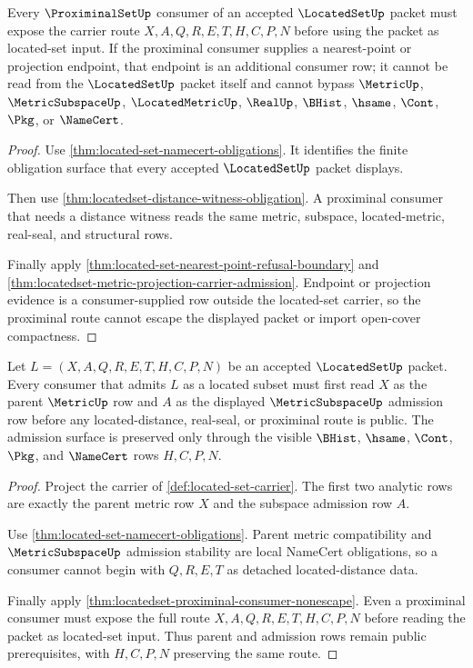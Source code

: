 \begin{theorem}
\label{thm:locatedset-proximinal-consumer-nonescape}
Every $\ProximinalSetUp$ consumer of an accepted $\LocatedSetUp$ packet must expose the carrier route $X,A,Q,R,E,T,H,C,P,N$ before using the packet as located-set input. If the proximinal consumer supplies a nearest-point or projection endpoint, that endpoint is an additional consumer row; it cannot be read from the $\LocatedSetUp$ packet itself and cannot bypass $\MetricUp$, $\MetricSubspaceUp$, $\LocatedMetricUp$, $\RealUp$, $\BHist$, $\hsame$, $\Cont$, $\Pkg$, or $\NameCert$.
\end{theorem}
\begin{proof}
Use \autoref{thm:located-set-namecert-obligations}. It identifies the finite obligation surface that every accepted $\LocatedSetUp$ packet displays.

Then use \autoref{thm:locatedset-distance-witness-obligation}. A proximinal consumer that needs a distance witness reads the same metric, subspace, located-metric, real-seal, and structural rows.

Finally apply \autoref{thm:located-set-nearest-point-refusal-boundary} and \autoref{thm:locatedset-metric-projection-carrier-admission}. Endpoint or projection evidence is a consumer-supplied row outside the located-set carrier, so the proximinal route cannot escape the displayed packet or import open-cover compactness.
\end{proof}

\begin{theorem}
\label{thm:located-set-parent-subspace-admission}
Let $L=(X,A,Q,R,E,T,H,C,P,N)$ be an accepted $\LocatedSetUp$ packet. Every consumer that admits $L$ as a located subset must first read $X$ as the parent $\MetricUp$ row and $A$ as the displayed $\MetricSubspaceUp$ admission row before any located-distance, real-seal, or proximinal route is public. The admission surface is preserved only through the visible $\BHist$, $\hsame$, $\Cont$, $\Pkg$, and $\NameCert$ rows $H,C,P,N$.
\end{theorem}
\begin{proof}
Project the carrier of \autoref{def:located-set-carrier}. The first two analytic rows are exactly the parent metric row $X$ and the subspace admission row $A$.

Use \autoref{thm:located-set-namecert-obligations}. Parent metric compatibility and $\MetricSubspaceUp$ admission stability are local NameCert obligations, so a consumer cannot begin with $Q,R,E,T$ as detached located-distance data.

Finally apply \autoref{thm:locatedset-proximinal-consumer-nonescape}. Even a proximinal consumer must expose the full route $X,A,Q,R,E,T,H,C,P,N$ before reading the packet as located-set input. Thus parent and admission rows remain public prerequisites, with $H,C,P,N$ preserving the same route.
\end{proof}


